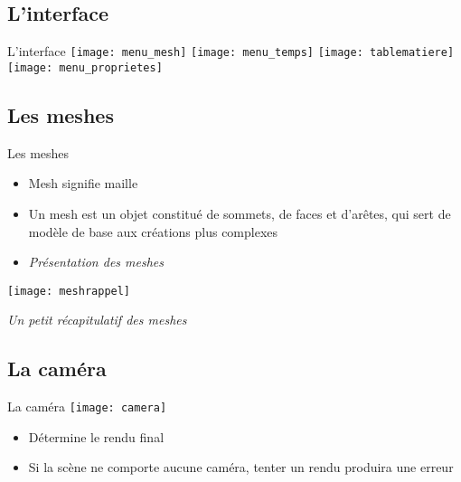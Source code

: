 \documentclass[xcolor=x11names,compress]{beamer}
\renewcommand{\(}{\begin{columns}}
\renewcommand{\)}{\end{columns}}
\newcommand{\<}[1]{\begin{column}{#1}}
\renewcommand{\>}{\end{column}}
\begin{document}
\subsection{L'interface}
\begin{frame}{L'interface}
    \texttt{[image: menu\_mesh]}
    \vspace{1cm} 
    \texttt{[image: menu\_temps]}
    \vspace{1cm}
    \texttt{[image: tablematiere]}
    \vspace{1cm}
    \texttt{[image: menu\_proprietes]}
\end{frame}

\subsection{Les meshes}
    \begin{frame}{Les meshes}
        \begin{itemize}
        \item Mesh signifie maille
        \item Un mesh est un objet constitué de sommets, de faces et d'arêtes, qui sert de modèle de base aux créations plus complexes
        \item \textit{Présentation des meshes}
    \end{itemize}
    \texttt{[image: meshrappel]}
    \begin{flushright}
        \textit{Un petit récapitulatif des meshes}
    \end{flushright}
\end{frame}

\subsection{La caméra}
\begin{frame}{La caméra}
 \centering \texttt{[image: camera]}
    \begin{itemize}
        \item Détermine le rendu final
        \item Si la scène ne comporte aucune caméra, tenter un rendu produira une erreur
\end{itemize}
\end{frame}
\end{document}
